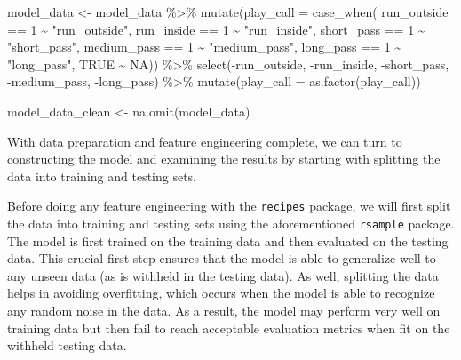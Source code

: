 \documentclass[
  letterpaper,
]{krantz}
\newenvironment{Shaded}{\begin{snugshade}}{\end{snugshade}}
\newcommand{\AttributeTok}[1]{\textcolor[rgb]{0.40,0.45,0.13}{#1}}
\newcommand{\ConstantTok}[1]{\textcolor[rgb]{0.56,0.35,0.01}{#1}}
\newcommand{\DecValTok}[1]{\textcolor[rgb]{0.68,0.00,0.00}{#1}}
\newcommand{\FunctionTok}[1]{\textcolor[rgb]{0.28,0.35,0.67}{#1}}
\newcommand{\NormalTok}[1]{\textcolor[rgb]{0.00,0.23,0.31}{#1}}
\newcommand{\OtherTok}[1]{\textcolor[rgb]{0.00,0.23,0.31}{#1}}
\newcommand{\SpecialCharTok}[1]{\textcolor[rgb]{0.37,0.37,0.37}{#1}}
\newcommand{\StringTok}[1]{\textcolor[rgb]{0.13,0.47,0.30}{#1}}
\begin{document}
\begin{Shaded}
\begin{Highlighting}[]
\NormalTok{model\_data }\OtherTok{\textless{}{-}}\NormalTok{ model\_data }\SpecialCharTok{\%\textgreater{}\%}
  \FunctionTok{mutate}\NormalTok{(}\AttributeTok{play\_call =} \FunctionTok{case\_when}\NormalTok{(}
\NormalTok{    run\_outside }\SpecialCharTok{==} \DecValTok{1} \SpecialCharTok{\textasciitilde{}} \StringTok{"run\_outside"}\NormalTok{,}
\NormalTok{    run\_inside }\SpecialCharTok{==} \DecValTok{1} \SpecialCharTok{\textasciitilde{}} \StringTok{"run\_inside"}\NormalTok{,}
\NormalTok{    short\_pass }\SpecialCharTok{==} \DecValTok{1} \SpecialCharTok{\textasciitilde{}} \StringTok{"short\_pass"}\NormalTok{,}
\NormalTok{    medium\_pass }\SpecialCharTok{==} \DecValTok{1} \SpecialCharTok{\textasciitilde{}} \StringTok{"medium\_pass"}\NormalTok{,}
\NormalTok{    long\_pass }\SpecialCharTok{==} \DecValTok{1} \SpecialCharTok{\textasciitilde{}} \StringTok{"long\_pass"}\NormalTok{,}
    \ConstantTok{TRUE} \SpecialCharTok{\textasciitilde{}} \ConstantTok{NA}\NormalTok{)) }\SpecialCharTok{\%\textgreater{}\%}
  \FunctionTok{select}\NormalTok{(}\SpecialCharTok{{-}}\NormalTok{run\_outside, }\SpecialCharTok{{-}}\NormalTok{run\_inside, }\SpecialCharTok{{-}}\NormalTok{short\_pass,}
         \SpecialCharTok{{-}}\NormalTok{medium\_pass, }\SpecialCharTok{{-}}\NormalTok{long\_pass) }\SpecialCharTok{\%\textgreater{}\%}
  \FunctionTok{mutate}\NormalTok{(}\AttributeTok{play\_call =} \FunctionTok{as.factor}\NormalTok{(play\_call))}

\NormalTok{model\_data\_clean }\OtherTok{\textless{}{-}} \FunctionTok{na.omit}\NormalTok{(model\_data)}
\end{Highlighting}
\end{Shaded}

With data preparation and feature engineering complete, we can turn to
constructing the model and examining the results by starting with
splitting the data into training and testing sets.

Before doing any feature engineering with the \texttt{recipes} package,
we will first split the data into training and testing sets using the
aforementioned \texttt{rsample} package. The model is first trained on
the training data and then evaluated on the testing data. This crucial
first step ensures that the model is able to generalize well to any
unseen data (as is withheld in the testing data). As well, splitting the
data helps in avoiding overfitting, which occurs when the model is able
to recognize any random noise in the data. As a result, the model may
perform very well on training data but then fail to reach acceptable
evaluation metrics when fit on the withheld testing data.
\end{document}
